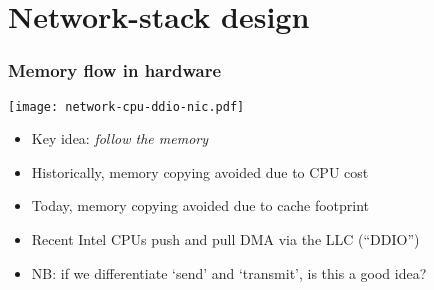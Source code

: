 \section{Network-stack design}

\begin{frame}
  \frametitle{Memory flow in hardware}

  \begin{center}
  \texttt{[image: network-cpu-ddio-nic.pdf]}
  \end{center}

  \medskip
  \pause

  \begin{itemize}
    \item Key idea: \textit{follow the memory}

    \medskip
    \pause

    \item Historically, memory copying avoided due to CPU cost
    \item Today, memory copying avoided due to cache footprint

    \medskip
    \pause

    \item Recent Intel CPUs push and pull DMA via the LLC (``DDIO'')
    \item NB: if we differentiate `send' and `transmit', is this a good idea?
  \end{itemize}
\end{frame}

